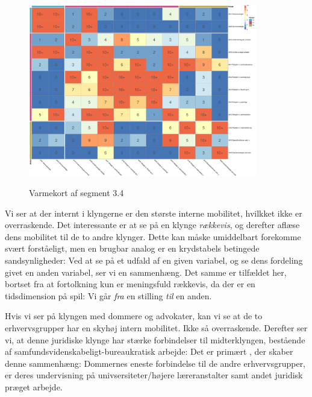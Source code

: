 % 
%
%
\begin{figure}
  \vspace{-20pt}
  \begin{center}
    \caption{Varmekort af segment 3.4}
      \includegraphics[width=10cm]{fig/heatmaps/seg3_4_RR_10.pdf}
    \label{fig delanalyse2 heatmap seg3.4 ledighed}
  \end{center}
  \vspace{-20pt}
\end{figure}

Vi ser at der internt i klyngerne er den største interne mobilitet, hvilkket ikke er overraskende. Det interessante er at se på en klynge \emph{rækkevis}, og derefter aflæse dens mobilitet til de to andre klynger. Dette kan måske umiddelbart forekomme svært forståeligt, men en brugbar analog er en krydstabels betingede sandsynligheder: Ved at se på et udfald af en given variabel, og se dens fordeling givet en anden variabel, ser vi en sammenhæng. Det samme er tilfældet her, bortset fra at fortolkning kun er meningsfuld rækkevis, da der er en tidsdimension på spil: Vi går \emph{fra} en stilling \emph{til} en anden. 

Hvis vi ser på klyngen med dommere og advokater, kan vi se at de to erhvervsgrupper har en skyhøj intern mobilitet. Ikke så overraskende. Derefter ser vi, at denne juridiske klynge har stærke forbindelser til midterklyngen, bestående af samfundsvidenskabeligt-bureaukratisk arbejde: Det er primært  , der skaber denne sammenhæng: Dommernes eneste forbindelse til de andre erhvervsgrupper, er deres undervisning på univsersiteter/højere læreranstalter samt andet juridisk præget arbejde. 


